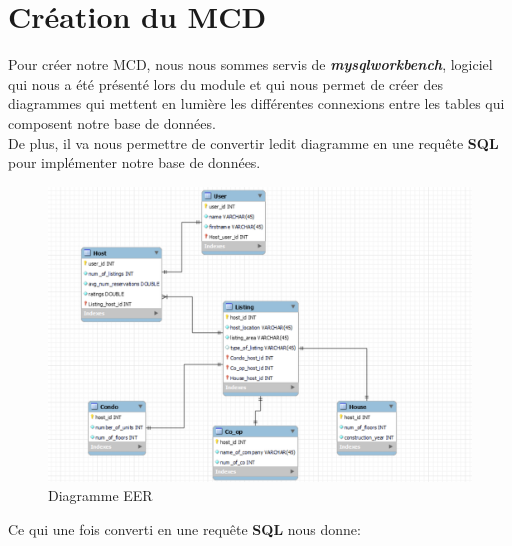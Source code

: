 \documentclass{report}
\begin{document}
\chapter{Création du MCD}
Pour créer notre MCD, nous nous sommes servis de \textbf{\emph{mysqlworkbench}}, logiciel qui nous a été présenté lors du module et qui nous permet de créer des diagrammes qui mettent en lumière les différentes connexions entre les tables qui composent notre base de données.\\
De plus, il va nous permettre de convertir ledit diagramme en une requête \textbf{SQL} pour implémenter notre base de données.
\begin{figure}[H] %
    \begin{center}
        \includegraphics[width=0.6\linewidth]{diagramme.png}
         \caption{Diagramme EER}
    \end{center}
\end{figure}
\newpage 
Ce qui une fois converti en une requête \textbf{SQL} nous donne:
\end{document}
